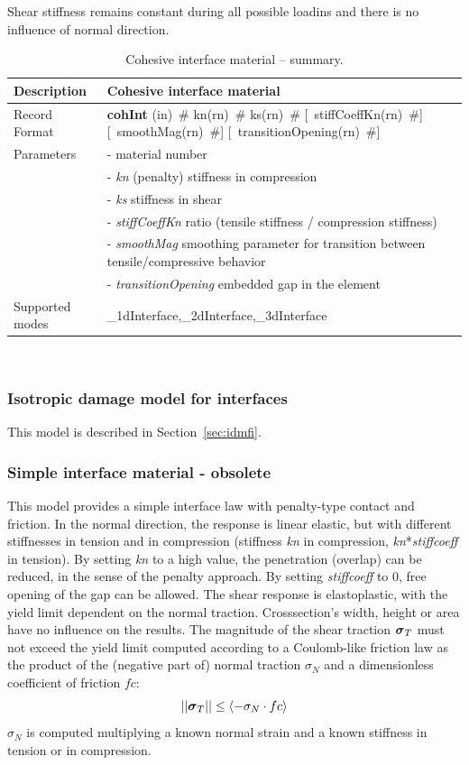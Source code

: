 \documentclass[a4paper]{article}
\newcommand{\mbf}[1]{\mbox{\boldmath$#1$}}
\newcommand{\descitem}[1]{{\noindent \bf #1}}
\newcommand{\elemparam}[2]{{{#1\tiny (#2)}~\#}}
\newcommand{\optelemparam}[2]{[{~\elemparam{#1}{#2}}]}
\newcommand{\param}[1]{{\it #1}}
\newcommand{\vsig}{\mbf{\sigma}}%
\newenvironment{mmt}{\begin{tabular}{|l|p{9cm}|}}{\end{tabular}\\}
\newenvironment{mmt}{\begin{tabular}{|l|l|}}{\end{tabular}\\}
\begin{document}
Shear stiffness remains constant during all possible loadins and there is no influence of normal direction.

\begin{table}[!htb]
\begin{mmt}
\hline
Description & Cohesive interface material\\
\hline
Record Format & \descitem{cohInt}  \elemparam{}{in}
\elemparam{kn}{rn} \elemparam{ks}{rn} \optelemparam{stiffCoeffKn}{rn}
\optelemparam{smoothMag}{rn} \optelemparam{transitionOpening}{rn}\\
Parameters &- \param{} material number\\
&- \param{kn} (penalty) stiffness in compression\\
&- \param{ks} stiffness in shear\\
&- \param{stiffCoeffKn} ratio (tensile stiffness / compression stiffness)\\
&- \param{smoothMag} smoothing parameter for transition between tensile/compressive behavior\\
&- \param{transitionOpening} embedded gap in the element\\
Supported modes& \_1dInterface,\_2dInterface,\_3dInterface\\
\hline
\end{mmt}
\caption{Cohesive interface material -- summary.}
\label{cohint_table}
\end{table}

\subsubsection{Isotropic damage model for interfaces}

This model is described in Section~\ref{sec:idmfi}.

\subsubsection{Simple interface material - obsolete}

This model provides a simple interface law with penalty-type contact and friction. 
In the normal direction, the response is linear elastic, but with different stiffnesses in tension and in compression (stiffness \param{kn} in compression, \param{kn}*\param{stiffcoeff} in tension). 
By setting \param{kn} to a high value, the penetration (overlap) can be reduced,
in the sense of the penalty approach. By setting  \param{stiffcoeff} to 0, free opening
of the gap can be allowed.
The shear response is elastoplastic, with the yield limit dependent on the normal traction. Crosssection's width, height or area have no influence on the results.
The magnitude of the shear traction $\vsig_T$ must not exceed the yield limit computed 
according to a Coulomb-like friction law as the product of the (negative part of)
 normal traction $\sigma_N$ and a dimensionless coefficient of friction $fc$:
\begin{equation}
    ||\vsig_T|| \leq \left\langle-\sigma_N\cdot fc\right\rangle 
\end{equation}
$\sigma_N$ is computed multiplying a known normal strain and a known stiffness in 
tension or in compression.
\end{document}
